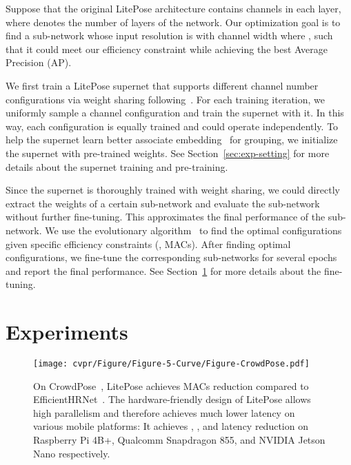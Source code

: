 \documentclass[10pt,twocolumn,letterpaper]{article}
\begin{document}
Suppose that the original LitePose architecture contains  channels in each layer, where  denotes the number of layers of the network. Our optimization goal is to find a sub-network whose input resolution is  with channel width  where , such that it could meet our efficiency constraint while achieving the best Average Precision (AP).

 We first train a LitePose supernet that supports different channel number configurations via weight sharing following~\cite{cai2019once,guo2020single}. For each training iteration, we uniformly sample a channel configuration and train the supernet with it. In this way, each configuration is equally trained and could operate independently.
To help the supernet learn better associate embedding~\cite{newell2016associative} for grouping, we initialize the supernet with pre-trained weights. See Section~\ref{sec:exp-setting} for more details about the supernet training and pre-training.

 Since the supernet is thoroughly trained with weight sharing, we could directly extract the weights of a certain sub-network and evaluate the sub-network without further fine-tuning. This approximates the final performance of the sub-network. We use the evolutionary algorithm~\cite{real2019regularized} to find the optimal configurations given specific efficiency constraints (\eg, MACs). After finding optimal configurations, we fine-tune the corresponding sub-networks for several epochs and report the final performance. See Section~\ref{sec:5} for more details about the fine-tuning.

 \section{Experiments}

\label{sec:5}
\begin{figure*}
\centering
	\texttt{[image: cvpr/Figure/Figure-5-Curve/Figure-CrowdPose.pdf]}
\caption{On CrowdPose~\cite{li2019crowdpose}, LitePose achieves  MACs reduction compared to EfficientHRNet~\cite{neff2020efficienthrnet}. The hardware-friendly design of LitePose allows high parallelism and therefore achieves much lower latency on various mobile platforms: It achieves , , and  latency reduction on Raspberry Pi 4B+, Qualcomm Snapdragon 855, and NVIDIA Jetson Nano respectively.}
\label{fig:crowdpose}
\end{figure*}
 
\end{document}
